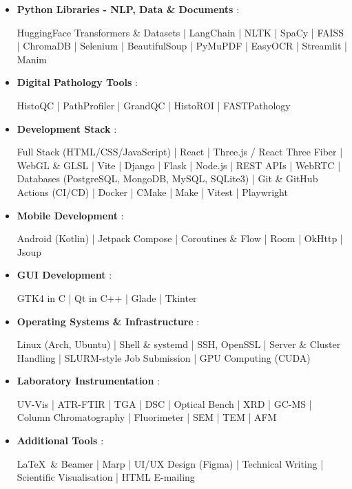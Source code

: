 \documentclass[a4paper,10pt]{article}
\newcommand{\skillBlock}[2]{
    \item \textbf{#1} : 
        \raggedright\small{#2}
    \vspace{-2pt}
}
\begin{document}
{\begin{itemize}[leftmargin=0.15in,label={},itemsep=2pt]
    \skillBlock{Python Libraries - NLP, Data \& Documents}{HuggingFace Transformers \& Datasets | LangChain | NLTK | SpaCy | FAISS | ChromaDB | Selenium | BeautifulSoup | PyMuPDF | EasyOCR | Streamlit | Manim}
    \skillBlock{Digital Pathology Tools}{HistoQC | PathProfiler | GrandQC | HistoROI | FASTPathology}
    \skillBlock{Development Stack}{Full Stack (HTML/CSS/JavaScript) | React | Three.js / React Three Fiber | WebGL \& GLSL | Vite | Django | Flask | Node.js | REST APIs | WebRTC | Databases (PostgreSQL, MongoDB, MySQL, SQLite3) | Git \& GitHub Actions (CI/CD) | Docker | CMake | Make | Vitest | Playwright}
    \skillBlock{Mobile Development}{Android (Kotlin) | Jetpack Compose | Coroutines \& Flow | Room | OkHttp | Jsoup}
    \skillBlock{GUI Development}{GTK4 in C | Qt in C++ | Glade | Tkinter}
    \skillBlock{Operating Systems \& Infrastructure}{Linux (Arch, Ubuntu) | Shell \& systemd | SSH, OpenSSL | Server \& Cluster Handling | SLURM-style Job Submission | GPU Computing (CUDA)}
    \skillBlock{Laboratory Instrumentation}{UV-Vis | ATR-FTIR | TGA | DSC | Optical Bench | XRD | GC-MS | Column Chromatography | Fluorimeter | SEM | TEM | AFM}
    \skillBlock{Additional Tools}{\LaTeX\ \& Beamer | Marp | UI/UX Design (Figma) | Technical Writing | Scientific Visualisation | HTML E-mailing}
\end{itemize}
}
\end{document}
